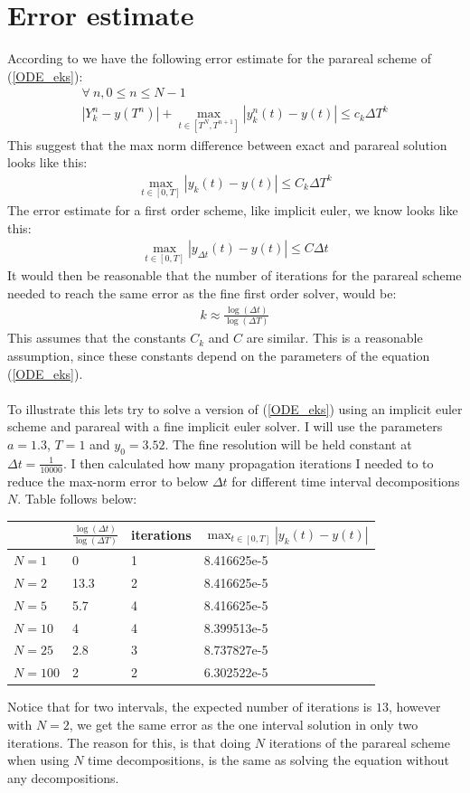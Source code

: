 \documentclass[11pt,a4paper]{article}
\begin{document}
\section{Error estimate}
According to \cite{lions2001resolution} we have the following error estimate for the parareal scheme of (\ref{ODE_eks}):
\begin{gather*}
\forall \ n,0\leq n\leq N-1 \\ |Y_k^n-y(T^n)| + \max_{t\in[T^N,T^{n+1}]}|y_k^n(t)-y(t)| \leq c_k\Delta T^k
\end{gather*} 
This suggest that the max norm difference between exact and parareal solution looks like this:
\begin{align*}
\max_{t\in[0,T]}|y_k(t)-y(t)| \leq C_k\Delta T^k
\end{align*}
The error estimate for a first order scheme, like implicit euler, we know looks like this:
\begin{align*}
\max_{t\in[0,T]}|y_{\Delta t}(t)-y(t)| \leq C\Delta t
\end{align*}
It would then be reasonable that the number of iterations for the parareal scheme needed to reach the same error as the fine first order solver, would be:
\begin{align*}
k\approx\frac{\log(\Delta t)}{\log(\Delta T)}
\end{align*}
This assumes that the constants $C_k$ and $C$ are similar. This is a reasonable assumption, since these constants depend on the parameters of the equation (\ref{ODE_eks}). 
\\
\\
To illustrate this lets try to solve a version of (\ref{ODE_eks}) using an implicit euler scheme and parareal with a fine implicit euler solver. I will use  the parameters $a=1.3$, $T=1$ and $y_0= 3.52$. The fine resolution will be held constant at $\Delta t=\frac{1}{10000}$. I then calculated how many propagation iterations I needed to to reduce the max-norm error to below $\Delta t$ for different time interval decompositions $N$. Table follows below:
 \begin{center}
    \begin{tabular}{| l | l | l | l |}
    \hline
     & $\frac{\log(\Delta t)}{\log(\Delta T)}$&iterations  & $\max_{t\in[0,T]}|y_k(t)-y(t)|$   \\ \hline
    $N=1$ &0 & 1& 8.416625e-5 	\\ \hline
    $N=2$ &13.3 &2& 8.416625e-5 	\\ \hline
    $N=5$ &5.7&4& 8.416625e-5	\\ \hline
    $N=10$ &4&4& 8.399513e-5	\\ \hline
    $N=25$ &2.8&3& 	8.737827e-5\\ \hline
    $N=100$ &2&2&	6.302522e-5\\ \hline
    \end{tabular}
\end{center}
Notice that for two intervals, the expected number of iterations is $13$, however with $N=2$, we get the same error as the one interval solution in only two iterations. The reason for this, is that doing $N$ iterations of the parareal scheme when using $N$ time decompositions, is the same as solving the equation without any decompositions. 
\end{document}

